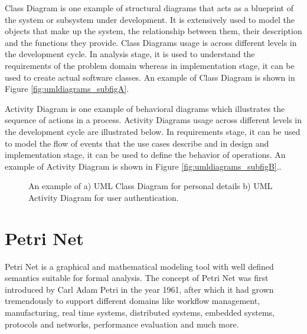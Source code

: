 Class Diagram is one example of structural diagrams that acts as a blueprint of the system or subsystem under development. It is extensively used to model the objects that make up the system, the relationship between them, their description and the functions they provide. Class Diagrams usage is across different levels in the development cycle. In analysis stage, it is used to understand the requirements of the problem domain whereas in implementation stage, it can be used to create actual software classes. An example of Class Diagram is shown in Figure \ref{fig:umldiagrams_subfigA}.

Activity Diagram is one example of behavioral diagrams which illustrates the sequence of actions in a process. Activity Diagrams usage across different levels in the development cycle are illustrated below. In requirements stage, it can be used to model the flow of events that the use cases describe and in design and implementation stage, it can be used to define the behavior of operations. An example of Activity Diagram is shown in Figure \ref{fig:umldiagrams_subfigB}..

\begin{figure}[htb!]
  \centering
	\caption{An example of a) UML Class Diagram for personal details b) UML Activity Diagram for user authentication.}
\label{fig:umldiagrams}
\end{figure}

\section{Petri Net}
Petri Net is a graphical and mathematical modeling tool with well defined semantics suitable for formal analysis. The concept of Petri Net was first introduced by Carl Adam Petri in the year 1961, after which it had grown tremendously to support different domains like workflow management, manufacturing, real time systems, distributed systems, embedded systems, protocols and networks, performance evaluation and much more.
 
